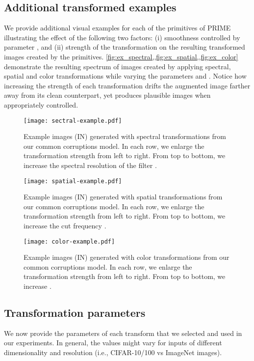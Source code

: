\documentclass[runningheads]{llncs}
\begin{document}
\subsection{Additional transformed examples}

We provide additional visual examples for each of the primitives of PRIME illustrating the effect of the following two factors: (i) smoothness controlled by parameter , and (ii) strength of the transformation  on the resulting transformed images created by the primitives. \cref{fig:ex_spectral,,fig:ex_spatial,,fig:ex_color} demonstrate the resulting spectrum of images created by applying spectral, spatial and color transformations while varying the parameters  and . Notice how increasing the strength  of each transformation drifts the augmented image farther away from its clean counterpart, yet produces plausible images when appropriately controlled.

\begin{figure}[!ht]
    \centering
    \texttt{[image: sectral-example.pdf]}
    \caption{Example images (IN) generated with spectral transformations from our common corruptions model. In each row, we enlarge the transformation strength  from left to right. From top to bottom, we increase the spectral resolution of the filter .}
    \label{fig:ex_spectral}
\end{figure}

\begin{figure}[!ht]
    \centering
    \texttt{[image: spatial-example.pdf]}
    \caption{Example images (IN) generated with spatial transformations from our common corruptions model. In each row, we enlarge the transformation strength  from left to right. From top to bottom, we increase the cut frequency .}
    \label{fig:ex_spatial}
\end{figure}

\begin{figure}[!ht]
    \centering
    \texttt{[image: color-example.pdf]}
    \caption{Example images (IN) generated with color transformations from our common corruptions model. In each row, we enlarge the transformation strength  from left to right. From top to bottom, we increase .}
    \vspace{-0.8em}
\label{fig:ex_color}
\end{figure}

\clearpage
\newpage


\subsection{Transformation parameters}
We now provide the parameters of each transform that we selected and used in our experiments. In general, the values might vary for inputs of different dimensionality and resolution (i.e., CIFAR-10/100 vs ImageNet images).
\end{document}
